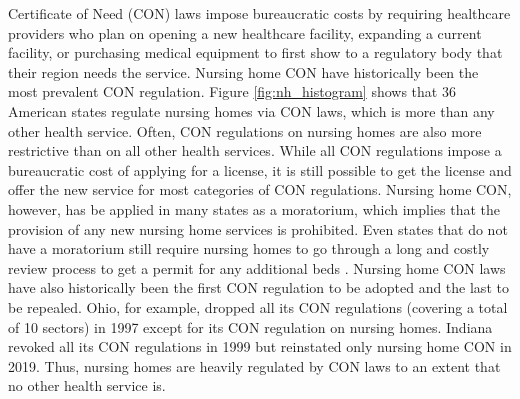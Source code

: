 \documentclass[../Main.tex]{subfiles}
\begin{document}
Certificate of Need (CON) laws impose bureaucratic costs by requiring healthcare providers who plan on opening a new healthcare facility, expanding a current facility, or purchasing medical equipment to first show to a regulatory body that their region needs the service. Nursing home CON have historically been the most prevalent CON regulation. Figure \ref{fig:nh_histogram} shows that 36 American states regulate nursing homes via CON laws, which is more than any other health service. Often, CON regulations on nursing homes are also more restrictive than on all other health services. While all CON regulations impose a bureaucratic cost of applying for a license, it is still possible to get the license and offer the new service for most categories of CON regulations. Nursing home CON, however, has be applied in many states as a moratorium, which implies that the provision of any new nursing home services is prohibited. Even states that do not have a moratorium still require nursing homes to go through a long and costly review process to get a permit for any additional beds \citep{american2020american}. Nursing home CON laws have also historically been the first CON regulation to be adopted and the last to be repealed. Ohio, for example, dropped all its CON regulations (covering a total of 10 sectors) in 1997 except for its CON regulation on nursing homes. Indiana revoked all its CON regulations in 1999 but reinstated only nursing home CON in 2019. Thus, nursing homes are heavily regulated by CON laws to an extent that no other health service is. 
 
\end{document}
